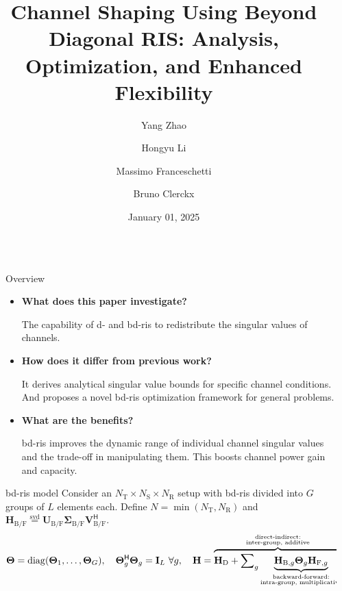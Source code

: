 \documentclass[final,xcolor={table}]{beamer}
\title{Channel Shaping Using Beyond Diagonal RIS: Analysis, Optimization, and Enhanced Flexibility}
\author{Yang Zhao \and Hongyu Li \and Massimo Franceschetti \and Bruno Clerckx}
\date{January 01, 2025}
\DeclareMathOperator{\diag}{diag}
\DeclareMathOperator{\svd}{svd}
\newlength{\sepwidth}
\newlength{\colwidth}
\newcommand{\separatorcolumn}{\begin{column}{\sepwidth}\end{column}}
\begin{document}
\begin{frame}[t]
	\begin{columns}[t]
		\separatorcolumn

		\begin{column}{\colwidth}
			\begin{block}{Overview}
				\begin{itemize}\setlength\itemsep{20pt}
					\item \textbf{What does this paper investigate?}

					The capability of \gls{d}- and \gls{bd}-\gls{ris} to redistribute the singular values of \glsfmtshort{mimo} channels.
					\item \textbf{How does it differ from previous work?}

					It derives analytical singular value bounds for specific channel conditions. And proposes a novel \gls{bd}-\gls{ris} optimization framework for general problems.
					\item \textbf{What are the benefits?}

					\gls{bd}-\gls{ris} improves the dynamic range of individual channel singular values and the trade-off in manipulating them. This boosts channel power gain and capacity.
				\end{itemize}
			\end{block}

			\begin{block}{\gls{bd}-\gls{ris} model}
				\setlength{\leftskip}{\leftmargini}
				\setlength{\rightskip}{\leftmargini}
				Consider an $N_\mathrm{T} \times N_\mathrm{S} \times N_\mathrm{R}$ setup with \gls{bd}-\gls{ris} divided into $G$ groups of $L$ elements each.
				Define $N = \min(N_\mathrm{T}, N_\mathrm{R})$ and $\mathbf{H}_{\mathrm{B}/\mathrm{F}}\stackrel{\svd}{=} \mathbf{U}_{\mathrm{B}/\mathrm{F}} \boldsymbol{\Sigma}_{\mathrm{B}/\mathrm{F}} \mathbf{V}_{\mathrm{B}/\mathrm{F}}^\mathsf{H}$.
				\begin{equation*}
					\mathbf{\Theta} = \diag(\mathbf{\Theta}_1,\ldots,\mathbf{\Theta}_G),\quad \mathbf{\Theta}_g^\mathsf{H} \mathbf{\Theta}_g = \mathbf{I}_L \ \forall g, \quad \mathbf{H} = \overbrace{\mathbf{H}_\mathrm{D} + \sum\nolimits_g \underbrace{\mathbf{H}_{\mathrm{B},g} \mathbf{\Theta}_g \mathbf{H}_{\mathrm{F},g}}_{\small{\substack{\text{backward-forward:}\\\text{intra-group, multiplicative}}}}}^{\small{\substack{\text{direct-indirect:}\\\text{inter-group, additive}}}}.
				\end{equation*}


\end{block}
\end{column}
\end{columns}
\end{frame}
\end{document}
